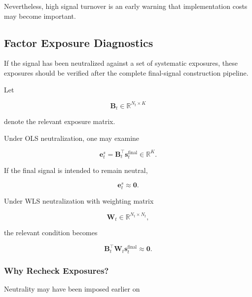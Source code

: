 \documentclass[11pt,a4paper]{article}
\begin{document}
Nevertheless, high signal turnover is an early warning that implementation
costs may become important.


\subsection{Factor Exposure Diagnostics}
\label{subsec:factor_exposure_diagnostics}

If the signal has been neutralized against a set of systematic exposures, these
exposures should be verified after the complete final-signal construction
pipeline.

Let

\begin{equation}
\mathbf{B}_t
\in
\mathbb{R}^{N_t\times K}
\end{equation}

denote the relevant exposure matrix.

Under OLS neutralization, one may examine

\begin{equation}
\boxed{
\mathbf{e}_t^{s}
=
\mathbf{B}_t^\top
\mathbf{s}_t^{\mathrm{final}}
\in
\mathbb{R}^{K}.
}
\end{equation}

If the final signal is intended to remain neutral,

\begin{equation}
\mathbf{e}_t^{s}
\approx
\mathbf{0}.
\end{equation}

Under WLS neutralization with weighting matrix

\begin{equation}
\mathbf{W}_t
\in
\mathbb{R}^{N_t\times N_t},
\end{equation}

the relevant condition becomes

\begin{equation}
\boxed{
\mathbf{B}_t^\top
\mathbf{W}_t
\mathbf{s}_t^{\mathrm{final}}
\approx
\mathbf{0}.
}
\end{equation}


\subsubsection{Why Recheck Exposures?}

Neutrality may have been imposed earlier on
\end{document}

